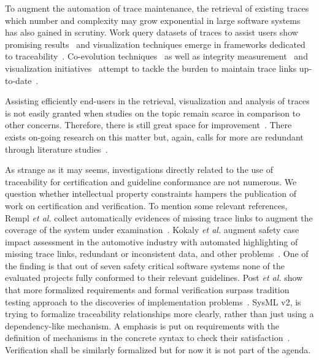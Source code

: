 To augment the automation of trace maintenance, the {retrieval} of existing traces which number and complexity may grow exponential in large software systems has also gained in scrutiny. Work query datasets of traces to assist users show promising results~\cite{dietrich2013-learning-efective-query-transformation-for-enhanced-req-trace-retrieval} and visualization techniques emerge in frameworks dedicated to traceability~\cite{ruiz18-traceME-conceptual-model-evolution,santiago2013traceability-in-MDE,heisig2019-generic-traceability-metamodel-end-to-end-capra}. 
Co-evolution techniques~\cite{mader2008-rule-based-maintenance-post-requirements-traceability,drivalos2010-state-based-traceability} as well as integrity measurement~\cite{rahimi2019-Evolving-trace-req2source} and visualization initiatives~\cite{fittkau2013-explorviz-Trace-Visualization} attempt to tackle the burden to maintain trace links up-to-date~\cite{seibel2010-dynamic-hierarchical-models-comprehensive-traceability,Bunder_2017_query-for-quality}. 

Assisting efficiently end-users in the retrieval, visualization and analysis of traces is not easily granted when studies on the topic remain scarce in comparison to other concerns. Therefore, there is still great space for improvement~\cite{antoniol2017-traceability-grand-challenges}. 
There exists on-going research on this matter but, again, calls for more are redundant through literature studies~\cite{Gotel2012}.

As strange as it may seems, investigations directly related to the use of traceability for certification and guideline conformance are not numerous. {We question whether intellectual property constraints hampers the publication of work on certification and verification.}
To mention some relevant references, Rempl \textit{et al.} collect automatically evidences of missing trace links to augment the coverage of the system under examination~\cite{rempl2014-conformance-of-traceability-to-guidelines}. Kokaly \textit{et al.} augment safety case impact assessment in the automotive industry with automated highlighting of missing trace links, redundant or inconsistent data, and other problems~\cite{kokaly2017-safety-case-impact-assessment-model-based-automotive}. One of the finding is that out of seven safety critical software systems none of the evaluated projects fully conformed to their relevant guidelines. Post \textit{et al.} show that more formalized requirements and formal verification surpass tradition testing approach to the discoveries of implementation problems~\cite{post2009-link-functional-req-to-verification}.
SysML v2, is trying to formalize traceability relationships more clearly, rather than just using a dependency-like mechanism. A emphasis is put on requirements with the definition of mechanisms in the concrete syntax to check their satisfaction~\cite{Haidrar_2016}. Verification shall be similarly formalized but for now it is not part of the agenda. 




